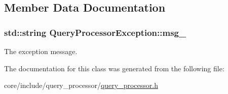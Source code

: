 \subsection{Member Data Documentation}
\hypertarget{classQueryProcessorException_a11ad5e07a10783cc3d4c8b1376162d7d}{}
\subsubsection[{msg\+\_\+}]{\setlength{\rightskip}{0pt plus 5cm}std\+::string Query\+Processor\+Exception\+::msg\+\_\+\hspace{0.3cm}{\ttfamily [private]}}\label{classQueryProcessorException_a11ad5e07a10783cc3d4c8b1376162d7d}
The exception message. 

The documentation for this class was generated from the following file\+:\begin{DoxyCompactItemize}
\item 
core/include/query\+\_\+processor/\hyperlink{query__processor_8h}{query\+\_\+processor.\+h}\end{DoxyCompactItemize}
